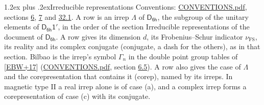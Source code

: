 \documentclass[10pt,a4paper]{article}
\makeatletter
\renewcommand\section{\@startsection{section}{1}{\z@}{-3ex plus -1ex minus -.2ex}%
  {1.2ex plus .2ex}{\normalfont\large\sffamily\bfseries\color{parttitle}}}
\numberwithin{equation}{section}
\newcommand{\grp}[1]{\mathsf{#1}}
\newcommand{\fsind}{\nu_{\mathrm{FS}}}
\makeatother
\begin{document}
\section{Irreducible representations}\label{s:irreps}
Conventions: \href{../../CONVENTIONS.pdf}{CONVENTIONS.pdf}, sections \href{../../../rotation/CONVENTIONS.pdf\#conv.6}{6}, \href{../../../rotation/CONVENTIONS.pdf\#conv.7}{7} and \href{../../CONVENTIONS.pdf\#conv.32.1}{32.1}.
\leavevmode\label{n:irrep.Delta}A row is an irrep $\Lambda$ of $\grp{D_{6h}}$, the subgroup of the unitary elements of $\grp{D_{6h}1'}$, in the order of the section Irreducible representations of the document of \href{../../../rotation/data/pdf/D6h.pdf}{$\grp{D_{6h}}$}. \label{n:index.dimension}\label{n:index.frobenius}\label{n:head.irrep}\label{n:head.reality}\label{n:head.conjugate}A row gives its dimension $d$, its Frobenius--Schur indicator $\fsind$, its reality and its complex conjugate (conjugate, a dash for the others), as in that section. \label{n:head.bilbao}\label{n:irrep.alias.gamma}Bilbao is the irrep's symbol $\Gamma_n$ in the double point group tables of [\href{../../../REFERENCES.pdf\#ref.EBW+17}{EBW+17}] (\href{../../CONVENTIONS.pdf}{CONVENTIONS.pdf}, section \href{../../../rotation/CONVENTIONS.pdf\#conv.6.5}{6.5}). \label{n:head.case.corep}\label{n:head.corep}A row also gives the case of $\Lambda$ and the corepresentation that contains it (corep), named by its irreps. In magnetic type II a real irrep alone is of case (a), and a complex irrep forms a corepresentation of case (c) with its conjugate.
\setlength{\emergencystretch}{2em}\par\setlength{\emergencystretch}{0pt}
\end{document}
